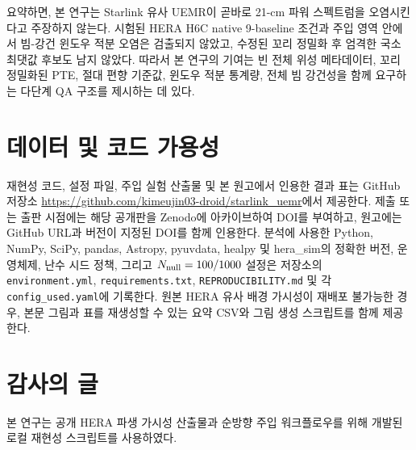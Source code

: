 \documentclass[final,5p,times]{elsarticle}
\begin{document}
요약하면, 본 연구는 Starlink 유사 UEMR이 곧바로 21-cm 파워 스펙트럼을 오염시킨다고 주장하지 않는다.
시험된 HERA H6C native 9-baseline 조건과 주입 영역 안에서 빔-강건 윈도우 적분 오염은 검출되지 않았고,
수정된 꼬리 정밀화 후 엄격한 국소 최댓값 후보도 남지 않았다.
따라서 본 연구의 기여는 빈 전체 위성 메타데이터, 꼬리 정밀화된 PTE, 절대 편향 기준값, 윈도우 적분 통계량,
전체 빔 강건성을 함께 요구하는 다단계 QA 구조를 제시하는 데 있다.

\section*{데이터 및 코드 가용성}
재현성 코드, 설정 파일, 주입 실험 산출물 및 본 원고에서 인용한 결과 표는 GitHub 저장소
\url{https://github.com/kimeujin03-droid/starlink_uemr}에서 제공한다. 제출 또는 출판 시점에는 해당 공개판을 Zenodo에
아카이브하여 DOI를 부여하고, 원고에는 GitHub URL과 버전이 지정된 DOI를 함께 인용한다. 분석에 사용한 Python, NumPy, SciPy,
pandas, Astropy, pyuvdata, healpy 및 hera\_sim의 정확한 버전, 운영체제, 난수 시드 정책, 그리고 $N_{\rm null}=100/1000$
설정은 저장소의 \texttt{environment.yml}, \texttt{requirements.txt}, \texttt{REPRODUCIBILITY.md} 및 각 \texttt{config\_used.yaml}에 기록한다.
원본 HERA 유사 배경 가시성이 재배포 불가능한 경우, 본문 그림과 표를 재생성할 수 있는 요약 CSV와 그림 생성 스크립트를 함께 제공한다.

\section*{감사의 글}
본 연구는 공개 HERA 파생 가시성 산출물과 순방향 주입 워크플로우를 위해 개발된 로컬 재현성 스크립트를 사용하였다.



\end{document}
